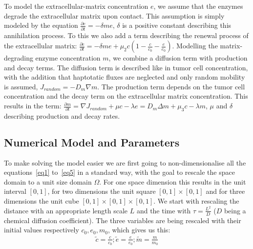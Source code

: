 To model the extracellular-matrix concentration $e$, we assume that the enzymes degrade the extracellular matrix upon contact. This assumption is simply modeled by the equation $\frac{\partial e}{\partial t} = -\delta m e$, $\delta$ is a positive constant describing this annihilation process. To this we also add a term describing the renewal  process of the extracellular matrix: $\frac{\partial e}{\partial t} = -\delta m e + \mu_2 c (1 - \frac{c}{c_0} - \frac{e}{e_0})$.\newline 
Modelling the matrix-degrading enzyme concentration $m$, we combine a diffusion term with production and decay terms. The diffusion term is described like in tumor cell concentration, with the addition that haptotatic fluxes are neglected and only random mobility is assumed, $J_{random} = -D_m \nabla m$. The production term depends on the tumor cell concentration and the decay term on the extracellular matrix concentration. This results in the term: $\frac{\partial m}{\partial t} = \nabla J_{random} + \mu c - \lambda e = D_m \Delta m + \mu_3 c - \lambda m$, $\mu$ and $\delta$ describing production and decay rates.


\subsection{Numerical Model and Parameters}

To make solving the model easier we are first going to non-dimensionalise all the equations~\ref{eq1} to~\ref{eq5} in a standard way, with the goal to rescale the space domain to a unit size domain $\Omega$. For one space dimension this results in the unit interval $[0,1]$, for two dimensions the unit square $[0,1] \times [0,1]$ and for three dimensions the unit cube $[0,1] \times [0,1] \times [0,1]$. 
We start with rescaling the distance with an appropriate length scale $L$ and the time with $\tau = \frac{L^2}{D}$ ($D$ being a chemical diffusion coefficient). The three variables are being rescaled with their initial values respectively $c_0, e_0, m_0$, which gives us this:
\begin{align*}
    \tilde{c} = \frac{c}{c_0};  \tilde{e} = \frac{e}{e_0};  \tilde{m} = \frac{m}{m_0}  
\end{align*}

